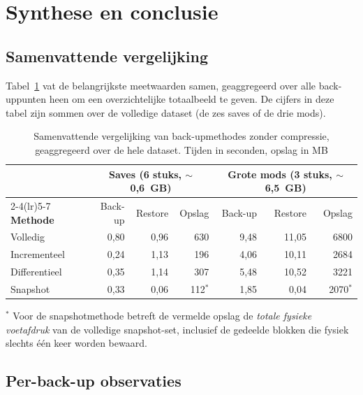 \section{Synthese en conclusie}
\label{sec:synthese}

\subsection{Samenvattende vergelijking}

Tabel~\ref{tab:summary} vat de belangrijkste meetwaarden samen, geaggregeerd over alle back-uppunten heen om een overzichtelijke totaalbeeld te geven. De cijfers in deze tabel zijn sommen over de volledige dataset (de zes saves of de drie mods).

\begin{table}[h]
    \centering
    \small
    \begin{tabular}{lrrrrrr}
        & \multicolumn{3}{c}{\textbf{Saves (6 stuks, $\sim$0{,}6~GB)}}
        & \multicolumn{3}{c}{\textbf{Grote mods (3 stuks, $\sim$6{,}5~GB)}} \\
        \cmidrule(lr){2-4}\cmidrule(lr){5-7}
        \textbf{Methode} & Back-up & Restore & Opslag
        & Back-up & Restore & Opslag \\
        \midrule
        Volledig       & 0{,}80 & 0{,}96 &  630 &  9{,}48 & 11{,}05 & 6800 \\
        Incrementeel   & 0{,}24 & 1{,}13 &  196 &  4{,}06 & 10{,}11 & 2684 \\
        Differentieel  & 0{,}35 & 1{,}14 &  307 &  5{,}48 & 10{,}52 & 3221 \\
        Snapshot       & 0{,}33 & 0{,}06 &  112$^{\ast}$ & 1{,}85 & 0{,}04  & 2070$^{\ast}$ \\
        \bottomrule
    \end{tabular}
    
    \vspace{0.4em}
    \footnotesize $^{\ast}$ Voor de snapshotmethode betreft de vermelde opslag de \emph{totale fysieke voetafdruk} van de volledige snapshot-set, inclusief de gedeelde blokken die fysiek slechts één keer worden bewaard.
    \caption{Samenvattende vergelijking van back-upmethodes zonder compressie, geaggregeerd over de hele dataset. Tijden in seconden, opslag in MB}
    \label{tab:summary}
\end{table}

\subsection{Per-back-up observaties}

